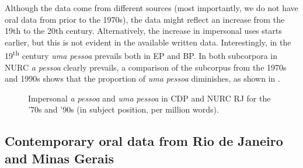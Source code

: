 \documentclass[output=paper]{langscibook}
\begin{document}
Although the data come from different sources (most importantly, we do not have oral data from prior to the 1970s), the data might reflect an increase from the 19th to the 20th century. Alternatively, the increase in impersonal uses starts earlier, but this is not evident in the available written data. Interestingly, in the 19\textsuperscript{th} {century} {\textit{uma pessoa}} {prevails both in EP and BP. In both subcorpora in NURC} {\textit{a pessoa} }{clearly prevails, a comparison of the subcorpus from the 1970s and 1990s shows that the proportion of} {\textit{uma pessoa}} {diminishes}, as shown in .




\begin{figure}
    \caption{\label{fig:amaral:2}Impersonal \textit{a pessoa} and \textit{uma pessoa} in CDP and NURC RJ for the ’70s and ’90s (in subject position, per million words).}
\end{figure}



\subsection{Contemporary oral data from Rio de Janeiro and Minas Gerais}\label{sec:amaral:5.3}
\end{document}
